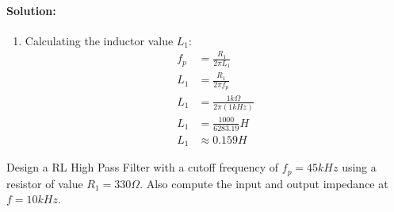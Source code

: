 \paragraph{Solution:}
\begin{enumerate}
  \item Calculating the inductor value \(L_1\):
    \begin{align*}
      f_p &= \frac{R_1}{2 \pi L_1} \\
      L_1 &= \frac{R_1}{2 \pi f_p} \\
      L_1 &= \frac{1 k\Omega}{2 \pi (1 kHz)} \\
      L_1 &= \frac{1000}{6283.19} H \\
      L_1 &\approx 0.159 H
    \end{align*}
\end{enumerate}
Design a RL High Pass Filter with a cutoff frequency of
\(f_p = 45kHz\) using a resistor of value \(R_1 = 330 \Omega\).
Also compute the input and output impedance at \(f = 10kHz\).
